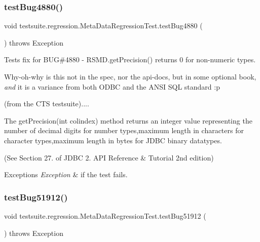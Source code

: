 \subsubsection{\texorpdfstring{test\+Bug4880()}{testBug4880()}}
{\footnotesize\ttfamily void testsuite.\+regression.\+Meta\+Data\+Regression\+Test.\+test\+Bug4880 (\begin{DoxyParamCaption}{ }\end{DoxyParamCaption}) throws Exception}

Tests fix for B\+UG\#4880 -\/ R\+S\+M\+D.\+get\+Precision() returns \textquotesingle{}0\textquotesingle{} for non-\/numeric types.

Why-\/oh-\/why is this not in the spec, nor the api-\/docs, but in some \textquotesingle{}optional\textquotesingle{} book, {\itshape and} it is a variance from both O\+D\+BC and the A\+N\+SI S\+QL standard \+:p

(from the C\+TS testsuite)....

The get\+Precision(int colindex) method returns an integer value representing the number of decimal digits for number types,maximum length in characters for character types,maximum length in bytes for J\+D\+BC binary datatypes.

(See Section 27. of J\+D\+BC 2. A\+PI Reference \& Tutorial 2nd edition)


\begin{DoxyExceptions}{Exceptions}
{\em Exception} & if the test fails. \\
\hline
\end{DoxyExceptions}
\mbox{\label{classtestsuite_1_1regression_1_1_meta_data_regression_test_a38cf409b423124090866e96e64226104}} 
\subsubsection{\texorpdfstring{test\+Bug51912()}{testBug51912()}}
{\footnotesize\ttfamily void testsuite.\+regression.\+Meta\+Data\+Regression\+Test.\+test\+Bug51912 (\begin{DoxyParamCaption}{ }\end{DoxyParamCaption}) throws Exception}

